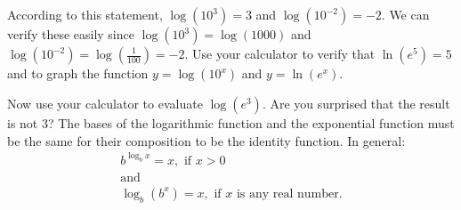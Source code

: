 \documentclass[10pt,]{book}
\theoremstyle{ptxdefinitionnotitle}
\theoremstyle{ptxdefinitiontitle}
\theoremstyle{ptxdefinitionnotitle}
\theoremstyle{ptxdefinitiontitle}
\theoremstyle{ptxdefinitionnotitle}
\theoremstyle{ptxdefinitiontitle}
\numberwithin{equation}{section}
\newcommand{\gt}{>}
\begin{document}
According to this statement, \(\log \left( 10^3 \right) = 3\) and \(\log \left( 10^{-2} \right) = -2\). We can verify these easily since \(\log \left( 10^3 \right) = \log \left( 1000 \right)\) and \(\log \left( 10^{-2} \right) = \log \left( \frac{1}{100} \right) = -2\). Use your calculator to verify that \(\ln \left( e^5 \right) = 5\) and to graph the function \(y = \log \left( 10^x \right)\) and \(y = \ln \left( e^x \right)\).%
\par
\hypertarget{p-335}{}%
Now use your calculator to evaluate \(\log \left( e^3 \right)\).  Are you surprised that the result is not \(3\)? The bases of the logarithmic function and the exponential function must be the same for their composition to be the identity function. In general:%
\begin{gather*}
b ^ {\log_b x} = x, \text{ if } x \gt 0\\
\text{and}\\
\log_b \left( b^x \right) = x, \text{ if } x \text{ is any real number.}
\end{gather*}
%
\typeout{************************************************}
\typeout{************************************************}
\end{document}
